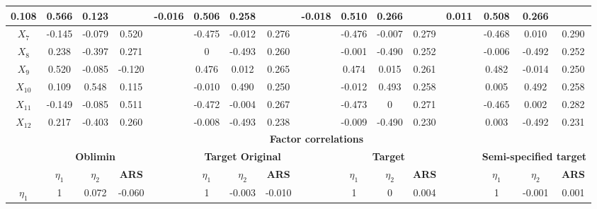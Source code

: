 \documentclass[a4paper,man,natbib]{apa6}
\begin{document}
\begin{linenumbers}
\begin{table}[]
\begin{adjustbox}{width = 0.9\textwidth}
\begin{tabular}{cccccccccccccccc}
		0.108 &
		0.566 &
		0.123 &
		&
		-0.016 &
		0.506 &
		0.258 &
		&
		-0.018 &
		0.510 &
		0.266 &
		&
		0.011 &
		0.508 &
		0.266 \\ \hline
		\textbf{$X_{7}$} &
		-0.145 &
		-0.079 &
		0.520 &
		&
		-0.475 &
		-0.012 &
		0.276 &
		&
		-0.476 &
		-0.007 &
		0.279 &
		&
		-0.468 &
		0.010 &
		0.290 \\ \hline
		\textbf{$X_{8}$} &
		0.238 &
		-0.397 &
		0.271 &
		&
		0 &
		-0.493 &
		0.260 &
		&
		-0.001 &
		-0.490 &
		0.252 &
		&
		-0.006 &
		-0.492 &
		0.252 \\ \hline
		\textbf{$X_{9}$} &
		0.520 &
		-0.085 &
		-0.120 &
		&
		0.476 &
		0.012 &
		0.265 &
		&
		0.474 &
		0.015 &
		0.261 &
		&
		0.482 &
		-0.014 &
		0.250 \\ \hline
		\textbf{$X_{10}$} &
		0.109 &
		0.548 &
		0.115 &
		&
		-0.010 &
		0.490 &
		0.250 &
		&
		-0.012 &
		0.493 &
		0.258 &
		&
		0.005 &
		0.492 &
		0.258 \\ \hline
		\textbf{$X_{11}$} &
		-0.149 &
		-0.085 &
		0.511 &
		&
		-0.472 &
		-0.004 &
		0.267 &
		&
		-0.473 &
		0 &
		0.271 &
		&
		-0.465 &
		0.002 &
		0.282 \\ \hline
		\textbf{$X_{12}$} &
		0.217 &
		-0.403 &
		0.260 &
		&
		-0.008 &
		-0.493 &
		0.238 &
		&
		-0.009 &
		-0.490 &
		0.230 &
		&
		0.003 &
		-0.492 &
		0.231 \\ \hline
		&
		\multicolumn{15}{c}{\textbf{Factor correlations}} \\ \hline
		&
		\multicolumn{3}{c}{\textbf{Oblimin}} &
		\multicolumn{1}{c}{\textbf{}} &
		\multicolumn{3}{c}{\textbf{Target Original}} &
		\multicolumn{1}{c}{\textbf{}} &
		\multicolumn{3}{c}{\textbf{Target}} &
		\multicolumn{1}{c}{\textbf{}} &
		\multicolumn{3}{c}{\textbf{Semi-specified target}} \\ \hline
		&
		\multicolumn{1}{c}{\textbf{$\eta_{1}$}} &
		\multicolumn{1}{c}{\textbf{$\eta_{2}$}} &
		\multicolumn{1}{c}{\textbf{ARS}} &
		&
		\multicolumn{1}{c}{\textbf{$\eta_{1}$}} &
		\multicolumn{1}{c}{\textbf{$\eta_{2}$}} &
		\multicolumn{1}{c}{\textbf{ARS}} &
		&
		\multicolumn{1}{c}{\textbf{$\eta_{1}$}} &
		\multicolumn{1}{c}{\textbf{$\eta_{2}$}} &
		\multicolumn{1}{c}{\textbf{ARS}} &
		&
		\multicolumn{1}{c}{\textbf{$\eta_{1}$}} &
		\multicolumn{1}{c}{\textbf{$\eta_{2}$}} &
		\multicolumn{1}{c}{\textbf{ARS}} \\ \hline
		\textbf{$\eta_{1}$} &
		1 &
		0.072 &
		-0.060 &
		&
		1 &
		-0.003 &
		-0.010 &
		&
		1 &
		0 &
		0.004 &
		&
		1 &
		-0.001 &
		0.001 \\ \hline

\end{tabular}
\end{adjustbox}
\end{table}
\end{linenumbers}
\end{document}
